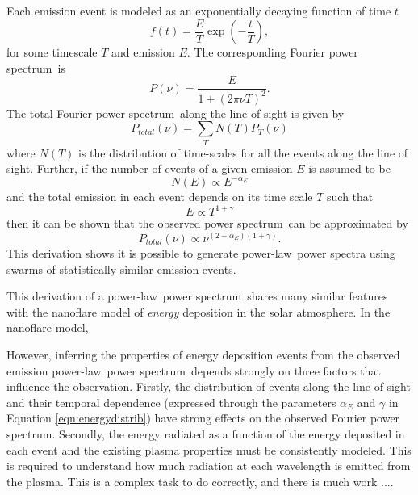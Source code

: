 \documentclass{aastex}
\newcommand{\PS}{power spectrum}
\newcommand{\PL}{power-law}
\newcommand{\Fps}{Fourier \PS}
\begin{document}
{Each emission event is modeled as an exponentially decaying function
of time $t$
\begin{equation}
\label{eqn:expdecay}
f(t) = \frac{E}{T}\exp\left(-\frac{t}{T}\right),
\end{equation}
for some timescale $T$ and emission $E$.  The corresponding \Fps\ is
\begin{equation}
\label{eqn:ftexpdecay}
P(\nu) = \frac{E}{1 + (2\pi \nu T)^{2}}.
\end{equation}
The total \Fps\ along the line of sight is given by
\begin{equation}
\label{eqn:sumftexpdecay}
P_{total}(\nu) = \sum_{T}N(T)P_{T}(\nu)
\end{equation}
where $N(T)$ is the distribution of time-scales for all the events
along the line of sight.  Further, if the number of events of a given
emission $E$ is assumed to be
\begin{equation}
\label{eqn:energydistrib}
N(E) \propto E^{-\alpha_{E}}
\end{equation}
and the total emission in each event depends on its time scale $T$
such that
\begin{equation}
\label{eqn:energytime}
E \propto T^{1+\gamma}
\end{equation}
then it can be shown that the observed \PS\ can be
approximated by
\begin{equation}
\label{eqn:finalfps}
P_{total}(\nu) \propto \nu^{(2-\alpha_{E})(1+\gamma)}.
\end{equation}
This derivation shows it is possible to generate \PL\ power spectra
using swarms of statistically similar emission events.  

This derivation of a \PL\ \PS\ shares many similar features
with the nanoflare model of {\it energy} deposition in the solar
atmosphere. In the nanoflare model,


However, inferring the properties of energy deposition events from the
observed emission \PL\ \PS\ depends strongly on three factors
that influence the observation.  Firstly, the distribution of events
along the line of sight and their temporal dependence (expressed
through the parameters $\alpha_{E}$ and $\gamma$ in Equation
\ref{eqn:energydistrib}) have strong effects on the observed \Fps.
Secondly, the energy radiated as a function of the energy deposited in
each event and the existing plasma properties must be consistently
modeled.  This is required to understand how much radiation at each
wavelength is emitted from the plasma.  This is a complex task to do
correctly, and there is much work ....


}
\end{document}
